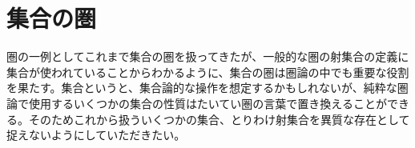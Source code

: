 \section{集合の圏}\label{chap-5-category-of-sets}

  圏の一例としてこれまで集合の圏を扱ってきたが、一般的な圏の射集合の定義に集合が使われていることからわかるように、集合の圏は圏論の中でも重要な役割を果たす。集合というと、集合論的な操作を想定するかもしれないが、純粋な圏論で使用するいくつかの集合の性質はたいてい圏の言葉で置き換えることができる。そのためこれから扱ういくつかの集合、とりわけ射集合を異質な存在として捉えないようにしていただきたい。

  
  
  
  